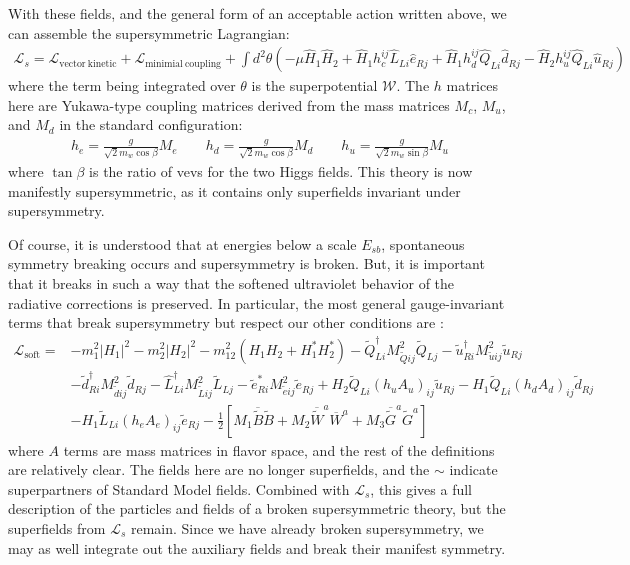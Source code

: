 With these fields, and the general form of an acceptable action written above, we can assemble the supersymmetric Lagrangian:
\begin{align}
  \mathcal{L}_s = \mathcal{L}_\mathrm{vector~kinetic} + \mathcal{L}_\mathrm{minimial~coupling} + \int d^2\theta \left( -\mu \hat{H}_1 \hat{H}_2 + \hat{H}_1 h_c^{ij}\hat{L}_{Li} \hat{e}_{Rj} + \hat{H}_1 h^{ij}_d \hat{Q}_{Li} \hat{d}_{Rj} - \hat{H}_2 h^{ij}_u \hat{Q}_{Li} \hat{u}_{Rj} \right)
\end{align}
where the term being integrated over $\theta$ is the superpotential $\mathcal{W}$. The $h$ matrices here are Yukawa-type coupling matrices derived from the mass matrices $M_c$, $M_u$, and $M_d$ in the standard configuration:
\begin{align}
  h_e = \frac{g}{\sqrt{2} m_w \cos{\beta}}M_e\quad \quad h_d = \frac{g}{\sqrt{2} m_w \cos{\beta}}M_d \quad \quad h_u = \frac{g}{\sqrt{2} m_w \sin{\beta}}M_u
\end{align}
where $\tan{\beta}$ is the ratio of vevs for the two Higgs fields. This theory is now manifestly supersymmetric, as it contains only superfields invariant under supersymmetry. 

Of course, it is understood that at energies below a scale $E_{sb}$, spontaneous symmetry breaking occurs and supersymmetry is broken. But, it is important that it breaks in such a way that the softened ultraviolet behavior of the radiative corrections is preserved. In particular, the most general gauge-invariant terms that break supersymmetry but respect our other conditions are \cite{Jungman}:
\begin{align}
  \mathcal{L}_\mathrm{soft} = &-m_1^2 |H_1|^2 - m_2^2 |H_2|^2 - m_{12}^2 \left( H_1 H_2 + H_1^* H_2^* \right) - \tilde{Q}_{Li}^\dagger M_{\tilde{Q} ij}^2 \tilde{Q}_{Lj} - \tilde{u}^\dagger_{Ri} M^2_{\tilde{u} i j} \tilde{u}_{Rj}\nonumber\\
  &-\tilde{d}_{Ri}^\dagger M^2_{\tilde{d} i j} \tilde{d}_{Rj} -\hat{L}^\dagger_{Li} M^2_{\tilde{L} ij} \tilde{L}_{Lj} - \tilde{e}^*_{Ri} M^2_{\tilde{e} ij} \tilde{e}_{Rj} + H_2 \tilde{Q}_{Li}(h_u A_u)_{ij} \tilde{u}_{Rj} -H_1 \tilde{Q}_{Li} (h_d A_d)_{ij} \tilde{d}_{Rj}\nonumber\\
  &-H_1 \tilde{L}_{Li} (h_e A_e)_{ij} \tilde{e}_{Rj} - \frac{1}{2} \left[ M_1 \overline{\tilde{B}} \tilde{B} + M_2 \overline{\tilde{W}}^a \overline{W}^a + M_3 \overline{\tilde{G}}^a \tilde{G}^a \right]
\end{align}
where $A$ terms are mass matrices in flavor space, and the rest of the definitions are relatively clear. The fields here are no longer superfields, and the $\sim$ indicate superpartners of Standard Model fields. Combined with $\mathcal{L}_s$, this gives a full description of the particles and fields of a broken supersymmetric theory, but the superfields from $\mathcal{L}_s$ remain. Since we have already broken supersymmetry, we may as well integrate out the auxiliary fields and break their manifest symmetry.


